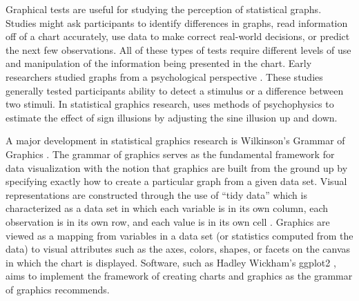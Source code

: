 \documentclass[12pt]{article}
\begin{document}
Graphical tests are useful for studying the perception of statistical
graphs. Studies might ask participants to identify differences in
graphs, read information off of a chart accurately, use data to make
correct real-world decisions, or predict the next few observations. All
of these types of tests require different levels of use and manipulation
of the information being presented in the chart. Early researchers
studied graphs from a psychological perspective
\citep{spence1990visual, lewandowsky1989perception}. These studies
generally tested participants ability to detect a stimulus or a
difference between two stimuli. In statistical graphics research,
\citet{vanderplas2015signs} uses methods of psychophysics to estimate
the effect of sign illusions by adjusting the sine illusion up and down.

A major development in statistical graphics research is Wilkinson's
Grammar of Graphics \citep{wilkinson2013grammar}. The grammar of
graphics serves as the fundamental framework for data visualization with
the notion that graphics are built from the ground up by specifying
exactly how to create a particular graph from a given data set. Visual
representations are constructed through the use of ``tidy data'' which
is characterized as a data set in which each variable is in its own
column, each observation is in its own row, and each value is in its own
cell \citep{wickham2016r}. Graphics are viewed as a mapping from
variables in a data set (or statistics computed from the data) to visual
attributes such as the axes, colors, shapes, or facets on the canvas in
which the chart is displayed. Software, such as Hadley Wickham's ggplot2
\citep{wickham2011ggplot2}, aims to implement the framework of creating
charts and graphics as the grammar of graphics recommends.
\end{document}
